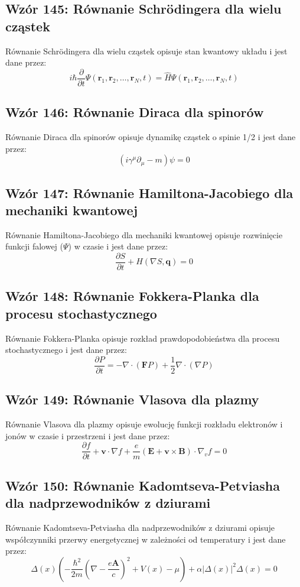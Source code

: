 \documentclass{article}
\begin{document}
\subsection*{Wzór 145: Równanie Schrödingera dla wielu cząstek}

Równanie Schrödingera dla wielu cząstek opisuje stan kwantowy układu i jest dane przez:
\[ i\hbar \frac{\partial}{\partial t} \Psi(\mathbf{r}_1, \mathbf{r}_2, \ldots, \mathbf{r}_N, t) = \hat{H}\Psi(\mathbf{r}_1, \mathbf{r}_2, \ldots, \mathbf{r}_N, t) \]

\subsection*{Wzór 146: Równanie Diraca dla spinorów}

Równanie Diraca dla spinorów opisuje dynamikę cząstek o spinie 1/2 i jest dane przez:
\[ (i\gamma^\mu \partial_\mu - m)\psi = 0 \]

\subsection*{Wzór 147: Równanie Hamiltona-Jacobiego dla mechaniki kwantowej}

Równanie Hamiltona-Jacobiego dla mechaniki kwantowej opisuje rozwinięcie funkcji falowej (\(\Psi\)) w czasie i jest dane przez:
\[ \frac{\partial S}{\partial t} + H(\nabla S, \mathbf{q}) = 0 \]

\subsection*{Wzór 148: Równanie Fokkera-Planka dla procesu stochastycznego}

Równanie Fokkera-Planka opisuje rozkład prawdopodobieństwa dla procesu stochastycznego i jest dane przez:
\[ \frac{\partial P}{\partial t} = -\nabla \cdot (\mathbf{F}P) + \frac{1}{2}\nabla \cdot (\nabla P) \]

\subsection*{Wzór 149: Równanie Vlasova dla plazmy}

Równanie Vlasova dla plazmy opisuje ewolucję funkcji rozkładu elektronów i jonów w czasie i przestrzeni i jest dane przez:
\[ \frac{\partial f}{\partial t} + \mathbf{v} \cdot \nabla f + \frac{e}{m}(\mathbf{E} + \mathbf{v} \times \mathbf{B}) \cdot \nabla_v f = 0 \]

\subsection*{Wzór 150: Równanie Kadomtseva-Petviasha dla nadprzewodników z dziurami}

Równanie Kadomtseva-Petviasha dla nadprzewodników z dziurami opisuje współczynniki przerwy energetycznej w zależności od temperatury i jest dane przez:
\[ \Delta(x)\left(-\frac{\hbar^2}{2m}(\nabla-\frac{e\mathbf{A}}{c})^2 + V(x) - \mu\right) + \alpha|\Delta(x)|^2\Delta(x) = 0 \]
\end{document}
